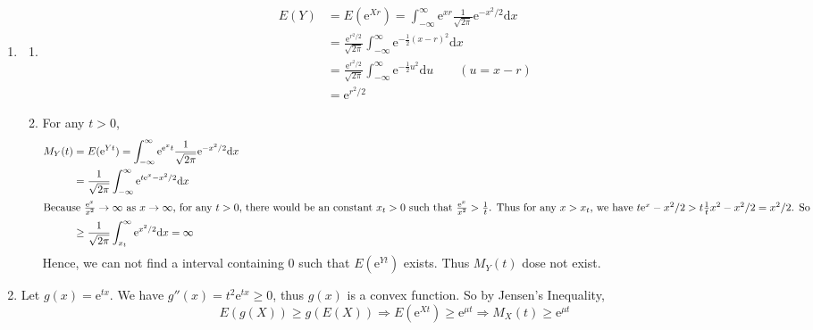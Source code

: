 \documentclass{article}
\begin{document}
\begin{enumerate}[leftmargin = 0 em, label = \arabic*., font = \bfseries]
\begin{enumerate}
		
	\end{enumerate}
	\item
	\begin{enumerate}
		\item 
	\begin{align*}
	E(Y) &= E(\mathrm{e}^{Xr}) = \int_{-\infty}^\infty \mathrm{e}^{xr} \frac{1}{\sqrt{2 \pi}} \mathrm{e}^{- x^2 / 2} \mathrm{d}x\\
	& = \frac{\mathrm{e}^{r^2 / 2}}{\sqrt{2 \pi}} \int_{-\infty}^\infty \mathrm{e}^{- \frac{1}{2}(x - r)^2} \mathrm{d}x \\
	& = \frac{\mathrm{e}^{r^2 / 2}}{\sqrt{2 \pi}} \int_{-\infty}^\infty \mathrm{e}^{- \frac{1}{2}u^2} \mathrm{d}u \qquad (u = x-r) \\
	& = \mathrm{e}^{r^2 /2}
	\end{align*}

	\item For any $t > 0$,
	\begin{align*}
	M_Y(t) &= E(\mathrm{e}^{Yt}) = \int_{-\infty}^{\infty} \mathrm{e}^{\mathrm{e}^x t} \frac{1}{\sqrt{2 \pi}}\mathrm{e}^{-x^2 / 2} \mathrm{d}x\\
	& = \frac{1}{\sqrt{2 \pi}} \int_{-\infty}^{\infty} \mathrm{e}^{t \mathrm{e}^x - x^2 / 2} \mathrm{d}x\\
	\intertext{Because $\frac{\mathrm{e}^x}{x^2} \to \infty$ as $x \to \infty$, for any $t>0$, there would be an constant $x_t > 0$ such that $\frac{\mathrm{e}^x}{x^2} > \frac{1}{t}$. Thus for any $x> x_t$, we have $t \mathrm{e}^{x} - x^2/ 2 > t \frac{1}{t} x^2 - x^2 / 2 = x^2 /2$. So}
	&\geq \frac{1}{\sqrt{2 \pi}} \int_{x_t}^{\infty} \mathrm{e}^{x^2 / 2} \mathrm{d}x = \infty
	\end{align*}
Hence, we can not find a interval containing 0 such that $E(\mathrm{e}^{Yt})$ exists. Thus $M_{Y}(t)$ dose not exist.
	
	
	\end{enumerate}

	\item
	Let $g(x) = \mathrm{e}^{tx}.$ We have $g''(x) = t^2 \mathrm{e}^{tx} \geq 0$, thus $g(x)$ is a convex function. So by Jensen's Inequality,
	\[E(g(X)) \geq g(E(X)) \Rightarrow E(\mathrm{e}^{Xt}) \geq \mathrm{e}^{\mu t} \Rightarrow M_X(t) \geq \mathrm{e}^{\mu t}\]
	

\end{enumerate}
\end{document}
